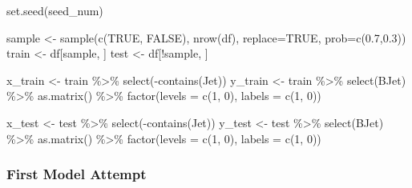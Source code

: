 \documentclass[
]{article}
\newenvironment{Shaded}{\begin{snugshade}}{\end{snugshade}}
\newcommand{\AttributeTok}[1]{\textcolor[rgb]{0.77,0.63,0.00}{#1}}
\newcommand{\ConstantTok}[1]{\textcolor[rgb]{0.00,0.00,0.00}{#1}}
\newcommand{\DecValTok}[1]{\textcolor[rgb]{0.00,0.00,0.81}{#1}}
\newcommand{\FloatTok}[1]{\textcolor[rgb]{0.00,0.00,0.81}{#1}}
\newcommand{\FunctionTok}[1]{\textcolor[rgb]{0.00,0.00,0.00}{#1}}
\newcommand{\NormalTok}[1]{#1}
\newcommand{\OtherTok}[1]{\textcolor[rgb]{0.56,0.35,0.01}{#1}}
\newcommand{\SpecialCharTok}[1]{\textcolor[rgb]{0.00,0.00,0.00}{#1}}
\newcommand{\StringTok}[1]{\textcolor[rgb]{0.31,0.60,0.02}{#1}}
\begin{document}
\begin{Shaded}
\begin{Highlighting}[]
\FunctionTok{set.seed}\NormalTok{(seed\_num)}

\NormalTok{sample }\OtherTok{\textless{}{-}} \FunctionTok{sample}\NormalTok{(}\FunctionTok{c}\NormalTok{(}\ConstantTok{TRUE}\NormalTok{, }\ConstantTok{FALSE}\NormalTok{), }\FunctionTok{nrow}\NormalTok{(df), }\AttributeTok{replace=}\ConstantTok{TRUE}\NormalTok{, }\AttributeTok{prob=}\FunctionTok{c}\NormalTok{(}\FloatTok{0.7}\NormalTok{,}\FloatTok{0.3}\NormalTok{))}
\NormalTok{train }\OtherTok{\textless{}{-}}\NormalTok{ df[sample, ]}
\NormalTok{test }\OtherTok{\textless{}{-}}\NormalTok{ df[}\SpecialCharTok{!}\NormalTok{sample, ]  }

\NormalTok{x\_train }\OtherTok{\textless{}{-}}\NormalTok{ train }\SpecialCharTok{\%\textgreater{}\%}
  \FunctionTok{select}\NormalTok{(}\SpecialCharTok{{-}}\FunctionTok{contains}\NormalTok{(}\StringTok{\textquotesingle{}Jet\textquotesingle{}}\NormalTok{)) }
\NormalTok{y\_train }\OtherTok{\textless{}{-}}\NormalTok{ train }\SpecialCharTok{\%\textgreater{}\%}
  \FunctionTok{select}\NormalTok{(BJet) }\SpecialCharTok{\%\textgreater{}\%} \FunctionTok{as.matrix}\NormalTok{() }\SpecialCharTok{\%\textgreater{}\%}
    \FunctionTok{factor}\NormalTok{(}\AttributeTok{levels =} \FunctionTok{c}\NormalTok{(}\DecValTok{1}\NormalTok{, }\DecValTok{0}\NormalTok{), }\AttributeTok{labels =} \FunctionTok{c}\NormalTok{(}\DecValTok{1}\NormalTok{, }\DecValTok{0}\NormalTok{))}

\NormalTok{x\_test }\OtherTok{\textless{}{-}}\NormalTok{ test }\SpecialCharTok{\%\textgreater{}\%}
  \FunctionTok{select}\NormalTok{(}\SpecialCharTok{{-}}\FunctionTok{contains}\NormalTok{(}\StringTok{\textquotesingle{}Jet\textquotesingle{}}\NormalTok{))}
\NormalTok{y\_test }\OtherTok{\textless{}{-}}\NormalTok{ test }\SpecialCharTok{\%\textgreater{}\%}
  \FunctionTok{select}\NormalTok{(BJet)  }\SpecialCharTok{\%\textgreater{}\%} \FunctionTok{as.matrix}\NormalTok{() }\SpecialCharTok{\%\textgreater{}\%}
    \FunctionTok{factor}\NormalTok{(}\AttributeTok{levels =} \FunctionTok{c}\NormalTok{(}\DecValTok{1}\NormalTok{, }\DecValTok{0}\NormalTok{), }\AttributeTok{labels =} \FunctionTok{c}\NormalTok{(}\DecValTok{1}\NormalTok{, }\DecValTok{0}\NormalTok{))}
\end{Highlighting}
\end{Shaded}

\hypertarget{first-model-attempt}{%
\subsubsection{First Model Attempt}\label{first-model-attempt}}
\end{document}
